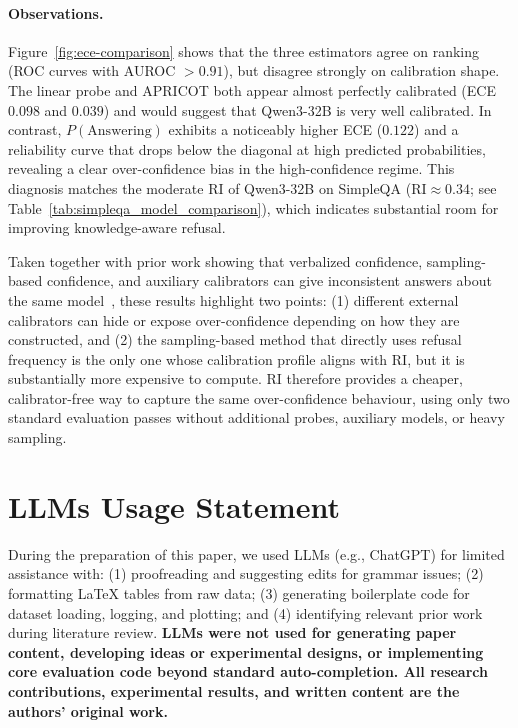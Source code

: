 \paragraph{Observations.}
Figure~\ref{fig:ece-comparison} shows that the three estimators agree on ranking (ROC curves with AUROC $>0.91$), but disagree strongly on calibration shape.
The linear probe and APRICOT both appear almost perfectly calibrated (ECE $0.098$ and $0.039$) and would suggest that Qwen3-32B is very well calibrated.
In contrast, $P(\mathrm{Answering})$ exhibits a noticeably higher ECE ($0.122$) and a reliability curve that drops below the diagonal at high predicted probabilities, revealing a clear over-confidence bias in the high-confidence regime. This diagnosis matches the moderate RI of Qwen3-32B on SimpleQA ($\mathrm{RI}\approx 0.34$; see Table~\ref{tab:simpleqa_model_comparison}), which indicates substantial room for improving knowledge-aware refusal.

Taken together with prior work showing that verbalized confidence, sampling-based confidence, and auxiliary calibrators can give inconsistent answers about the same model~\citep{wei2024simpleqa,huang2024rankcalibration}, these results highlight two points: (1) different external calibrators can hide or expose over-confidence depending on how they are constructed, and (2) the sampling-based method that directly uses refusal frequency is the only one whose calibration profile aligns with RI, but it is substantially more expensive to compute. RI therefore provides a cheaper, calibrator-free way to capture the same over-confidence behaviour, using only two standard evaluation passes without additional probes, auxiliary models, or heavy sampling.



\section{LLMs Usage Statement}

During the preparation of this paper, we used LLMs (e.g., ChatGPT) for limited assistance with: (1) proofreading and suggesting edits for grammar issues; (2) formatting LaTeX tables from raw data; (3) generating boilerplate code for dataset loading, logging, and plotting; and (4) identifying relevant prior work during literature review. \textbf{LLMs were not used for generating paper content, developing ideas or experimental designs, or implementing core evaluation code beyond standard auto-completion. All research contributions, experimental results, and written content are the authors' original work.}
